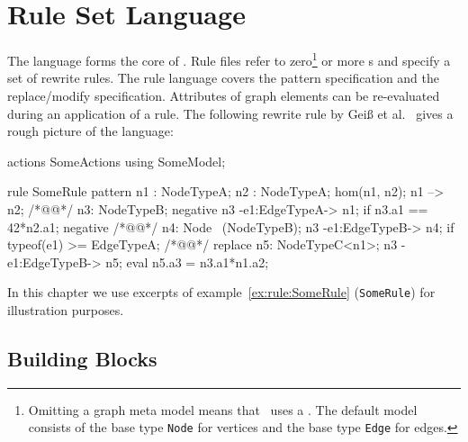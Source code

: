 \chapter{Rule Set Language}
\label{chaprulelang}

The  language forms the core of \GrG. Rule files refer to zero\footnote{Omitting a graph meta model means that \GrG\ uses a . The default model consists of the base type \texttt{Node} for vertices and the base type \texttt{Edge} for edges.} or more s and specify a set of rewrite rules. The rule language covers the pattern specification and the replace/modify specification. Attributes of graph elements can be re-evaluated during an application of a rule. The following rewrite rule by Geiß et al.~\cite{GBGHS:06} gives a rough picture of the language:
\begin{example}\label{ex:rule:SomeRule}
\begin{grgen}
actions SomeActions using SomeModel;

rule SomeRule {
  pattern {
    n1 : NodeTypeA;
    n2 : NodeTypeA;
    hom(n1, n2);
    n1 --> n2; /*@\label{ex:somerule:graphlet}@*/
    n3: NodeTypeB;
    negative {
      n3 -e1:EdgeTypeA-> n1;
      if {n3.a1 == 42*n2.a1;}
    }
    negative { /*@\label{ex:somerule:secondnac:begin}@*/
      n4: Node \ (NodeTypeB);
      n3 -e1:EdgeTypeB-> n4;
      if {typeof(e1) >= EdgeTypeA;}
    } /*@\label{ex:somerule:secondnac:end}@*/
  }
  replace {
    n5: NodeTypeC<n1>;
    n3 -e1:EdgeTypeB-> n5;
    eval {
      n5.a3 = n3.a1*n1.a2;
    }
  }  
}
\end{grgen}
\end{example}
In this chapter we use excerpts of example~\ref{ex:rule:SomeRule} (\texttt{SomeRule}) for illustration purposes.

\section{Building Blocks}
\label{rulebb}

